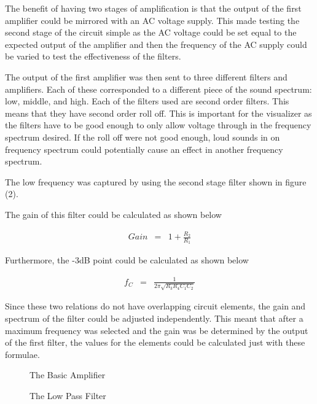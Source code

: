 \documentclass{article}
\begin{document}
The benefit of having two stages of amplification is that the output of the first amplifier could be mirrored with an AC voltage supply. This made testing the second stage of the circuit simple as the AC voltage could be set equal to the expected output of the amplifier and then the frequency of the AC supply could be varied to test the effectiveness of the filters. 

The output of the first amplifier was then sent to three different filters and amplifiers. Each of these corresponded to a different piece of the sound spectrum: low, middle, and high. Each of the filters used are second order filters. This means that they have second order roll off. This is important for the visualizer as the filters have to be good enough to only allow voltage through in the frequency spectrum desired. If the roll off were not good enough, loud sounds in on frequency spectrum could potentially cause an effect in another frequency spectrum. 

The low frequency was captured by using the second stage filter shown in figure (2).%

The gain of this filter could be calculated as shown below%

\begin{eqnarray}
Gain &=& 1 + \frac{R_2}{R_1} 
\end{eqnarray}

Furthermore, the -3dB point could be calculated as shown below%

\begin{eqnarray}
f_C &=& \frac{1}{2\pi \sqrt{R_3R_4C_1C_2}}
\end{eqnarray}

Since these two relations do not have overlapping circuit elements, the gain and spectrum of the filter could be adjusted independently. This meant that after a maximum frequency was selected and the gain was be determined by the output of the first filter, the values for the elements could be calculated just with these formulae. 

\begin{figure}[t]

\begin{minipage}[b]{1.0\linewidth}
  \centering
  \centerline{}
\caption{The Basic Amplifier}
\end{minipage}
\begin{minipage}[b]{1.0\linewidth}
  \centering
  \centerline{}
\caption{The Low Pass Filter}
\end{minipage}
\end{figure}
\end{document}
